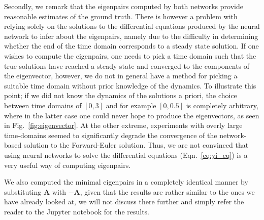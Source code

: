 \documentclass[reprint, english, nofootinbib]{revtex4-2}
\begin{document}
Secondly, we remark that the eigenpairs computed by both networks provide reasonable estimates of the ground truth. There is however a problem with relying solely on the solutions to the differential equations produced by the neural network to infer about the eigenpairs, namely due to the difficulty in determining whether the end of the time domain corresponds to a steady state solution. If one wishes to compute the eigenpairs, one needs to pick a time domain such that the true solutions have reached a steady state and converged to the components of the eigenvector, however, we do not in general have a method for picking a suitable time domain without prior knowledge of the dynamics. To illustrate this point; if we did not know the dynamics of the solutions a priori, the choice between time domains of $[0,3]$ and for example $[0,0.5]$ is completely arbitrary, where in the latter case one could never hope to produce the eigenvectors, as seen in Fig.~\ref{fig:eigenvector}. At the other extreme, experiments with overly large time-domains seemed to significantly degrade the convergence of the network-based solution to the Forward-Euler solution. Thus, we are not convinced that using neural networks to solve the differential equations (Eqn.~\ref{eq:yi_eq}) is a very useful way of computing eigenpairs.

We also computed the minimal eigenpairs in a completely identical manner by substituting $\mathbf A$ with $- \mathbf A$, given that the results are rather similar to the ones we have already looked at, we will not discuss there further and simply refer the reader to the Jupyter notebook for the results.
\end{document}
